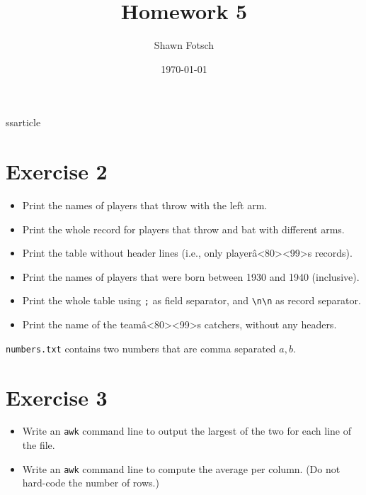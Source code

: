 ss{article}
\usepackage{verbatim}
\usepackage[margin=1in]{geometry}
\usepackage{amsmath}
\usepackage[english]{babel}
\usepackage{listings}
\lstset{language=C,basicstyle=\ttfamily,breaklines=true}
\usepackage[autostyle=true, english = american]{csquotes}
\MakeOuterQuote{+}

\newcommand{\n}{\par\vspace{\baselineskip}}

\title{Homework 5}
\author{Shawn Fotsch}
\date{\today}


   \maketitle

   \section{Exercise 2}
      \begin{itemize}
      \item Print the names of players that throw with the left arm. \n

      \item Print the whole record for players that throw and bat with different arms. \n

      \item Print the table without header lines (i.e., only playerâ<80><99>s records). \n

      \item Print the names of players that were born between 1930 and 1940 (inclusive). \n

      \item Print the whole table using \verb:;: as field separator, and \verb;\n\n; as record separator. \n

      \item Print the name of the teamâ<80><99>s catchers, without any headers. \n

      \end{itemize}

                \verb;numbers.txt; contains two numbers that are comma separated $a, b$.
   \section{Exercise 3}
      \begin{itemize}
      \item Write an \verb;awk; command line to output the largest of the two for each line of the file.\n

      \item Write an \verb;awk; command line to compute the average per column. (Do not hard-code the number of rows.)\n

      \end{itemize}

